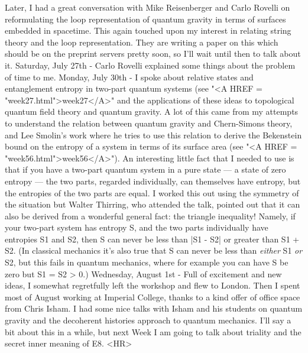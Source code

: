 Later, I had a great conversation with Mike Reisenberger and
Carlo Rovelli on reformulating the loop representation of quantum
gravity in terms of surfaces embedded in spacetime.  This again
touched upon my interest in relating string theory and the loop
representation.  They are writing a paper on this which should be
on the preprint servers pretty soon, so I'll wait until then to
talk about it.
Saturday, July 27th - Carlo Rovelli explained some things about
the problem of time to me.
Monday, July 30th - I spoke about relative states and
entanglement entropy in two-part quantum systems (see "<A HREF =
"week27.html">week27</A>" 
and the applications of these ideas to topological quantum field
theory and quantum gravity.  A lot of this came from my attempts
to understand the relation between quantum gravity and
Chern-Simons theory, and Lee Smolin's work where he tries to use
this relation to derive the Bekenstein bound on the entropy of a
system in terms of its surface area (see "<A HREF =
"week56.html">week56</A>").   
An interesting little fact that I needed to use is that if you
have a two-part quantum system in a pure state --- a state of
zero entropy --- the two parts, regarded individually, can
themselves  have entropy, but the entropies of the two parts are
equal.  I worked this out using the symmetry of the situation but
Walter Thirring, who attended the talk, pointed out that it can
also be derived from a wonderful general fact: the triangle
inequality!  Namely, if your two-part system has entropy S, and
the two parts individually have entropies S1 and S2, then S can
never be less than |S1 - S2| or greater than S1 + S2.  (In
classical mechanics it's also true that S can never be less than
\emph{either} S1 \emph{or} S2, but this fails in quantum mechanics, where
for example you can have S be zero but S1 = S2 > 0.)  
Wednesday, August 1st - Full of excitement and new ideas, I
somewhat regretfully left the workshop and flew to London.  Then
I spent most of August working at Imperial College, thanks to a
kind offer of office space from Chris Isham. I had some nice
talks with Isham and his students on quantum gravity and the
decoherent histories approach to quantum mechanics.  I'll say a
bit about this in a while, but next Week I am going to talk about
triality and the secret inner meaning of E8.
<HR>



